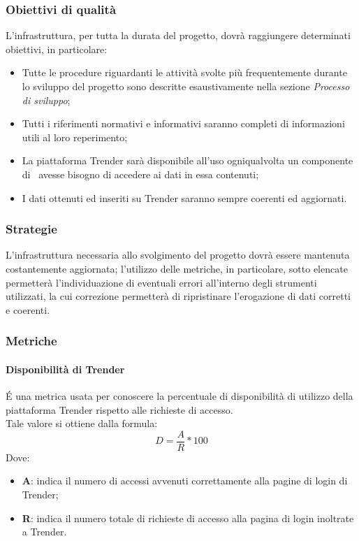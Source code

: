 \documentclass[../PianoDiQualifica.tex]{subfiles}
\begin{document}
			\subsubsection{Obiettivi di qualità}
			L'infrastruttura, per tutta la durata del progetto, dovrà raggiungere determinati obiettivi, in particolare:
			\begin{itemize}
				\item Tutte le procedure riguardanti le attività svolte più frequentemente durante lo sviluppo del progetto sono descritte esaustivamente nella sezione \textit{Processo di sviluppo};
				\item Tutti i riferimenti normativi e informativi saranno completi di informazioni utili al loro reperimento;
				\item La piattaforma Trender sarà disponibile all'uso ogniqualvolta un componente di \kpanic\ avesse bisogno di accedere ai dati in essa contenuti;
				\item I dati ottenuti ed inseriti su Trender saranno sempre coerenti ed aggiornati.
			\end{itemize}
			
			\subsubsection{Strategie}
			L'infrastruttura necessaria allo svolgimento del progetto dovrà essere mantenuta costantemente aggiornata; l'utilizzo delle metriche, in particolare, sotto elencate permetterà l'individuazione di eventuali errori all'interno degli strumenti utilizzati, la cui correzione permetterà di ripristinare l'erogazione di dati corretti e coerenti.
			
			\subsubsection{Metriche}
			\paragraph{Disponibilità di Trender}
			É una metrica usata per conoscere la percentuale di disponibilità di utilizzo della piattaforma Trender rispetto alle richieste di accesso.\\Tale valore si ottiene dalla formula:
				\begin{equation*}
					D = \frac{A}{R} * 100
				\end{equation*}
				Dove:
				\begin{itemize}
					\item \textbf{A}: indica il numero di accessi avvenuti correttamente alla pagine di login di Trender;
					\item \textbf{R}: indica il numero totale di richieste di accesso alla pagina di login inoltrate a Trender.
				\end{itemize}
			
\end{document}
